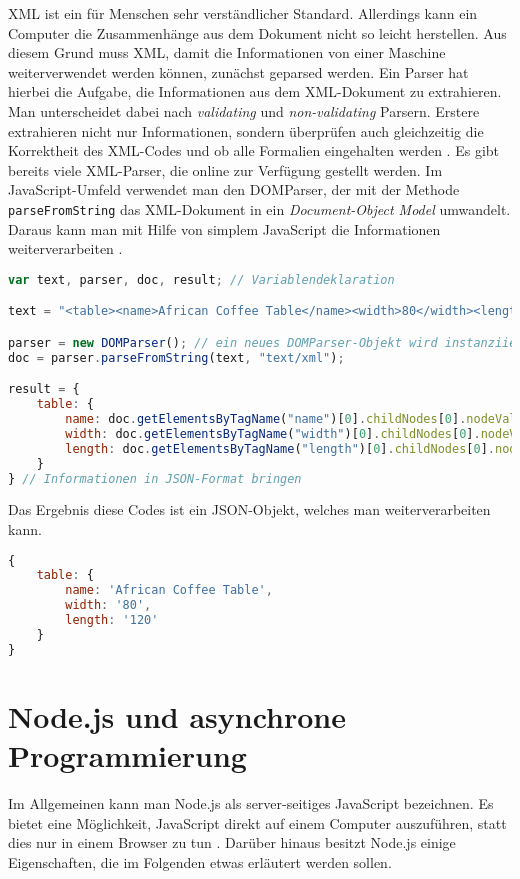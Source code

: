 XML ist ein für Menschen sehr verständlicher Standard. Allerdings kann ein Computer die Zusammenhänge aus dem Dokument nicht so leicht herstellen. Aus diesem Grund muss \ac{XML}, damit die Informationen von einer Maschine weiterverwendet werden können, zunächst geparsed werden. Ein Parser hat hierbei die Aufgabe, die Informationen aus dem \ac{XML}-Dokument zu extrahieren. Man unterscheidet dabei nach \textit{validating} und \textit{non-validating} Parsern. Erstere extrahieren nicht nur Informationen, sondern überprüfen auch gleichzeitig die Korrektheit des \ac{XML}-Codes und ob alle Formalien eingehalten werden \cite{pars}. Es gibt bereits viele \ac{XML}-Parser, die online zur Verfügung gestellt werden. Im JavaScript-Umfeld verwendet man den DOMParser, der mit der Methode \texttt{parseFromString} das \ac{XML}-Dokument in ein \textit{Document-Object Model} umwandelt. Daraus kann man mit Hilfe von simplem JavaScript die Informationen weiterverarbeiten \cite{w3pars}. \\

\begin{lstlisting}[title=Verwendung des DOMParsers für XML, language=JavaScript]
var text, parser, doc, result; // Variablendeklaration

text = "<table><name>African Coffee Table</name><width>80</width><length>120</length></table>"; // der zu parsende Text

parser = new DOMParser(); // ein neues DOMParser-Objekt wird instanziiert
doc = parser.parseFromString(text, "text/xml");

result = {
	table: {
		name: doc.getElementsByTagName("name")[0].childNodes[0].nodeValue,
		width: doc.getElementsByTagName("width")[0].childNodes[0].nodeValue,
		length: doc.getElementsByTagName("length")[0].childNodes[0].nodeValue
	}
} // Informationen in JSON-Format bringen
\end{lstlisting}

Das Ergebnis diese Codes ist ein JSON-Objekt, welches man weiterverarbeiten kann. \\

\begin{lstlisting}[title=Ergebnis nach dem Parsen, language=JavaScript]
{
	table: {
		name: 'African Coffee Table',
		width: '80',
		length: '120'
	}
}
\end{lstlisting}



\newpage

\section{Node.js und asynchrone Programmierung}
\large
Im Allgemeinen kann man Node.js als server-seitiges JavaScript bezeichnen. Es bietet eine Möglichkeit, JavaScript direkt auf einem Computer auszuführen, statt dies nur in einem Browser zu tun \cite{njsspec}. Darüber hinaus besitzt Node.js einige Eigenschaften, die im Folgenden etwas erläutert werden sollen.

